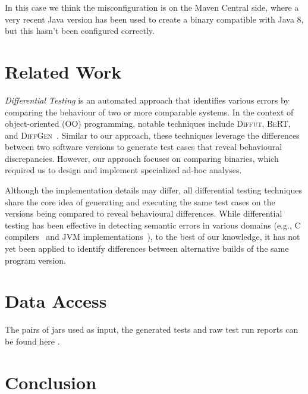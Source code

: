 \documentclass[conference]{IEEEtran}
\newcommand{\jens}[1]{\textbf{\textcolor{magenta}{[ \ding{46}Jens: #1]}}}
\renewcommand{\jens}[1]{}
\begin{document}
In this case we think the misconfiguration is on the Maven Central side, where a very recent Java version has been used to create a binary compatible with Java 8, but this hasn't been configured correctly.





\section{Related Work}
\label{sec:relatedwork}

\emph{Differential Testing}\cite{difftesting} is an automated approach that identifies various errors by comparing the behaviour of two or more comparable systems\cite{xie2007towards,jin10:automated,diffgen}. In the context of object-oriented (OO) programming, notable techniques include \textsc{Diffut}\cite{xie2007towards}, \textsc{BeRT}\cite{jin10:automated}, and \textsc{DiffGen}~\cite{diffgen}. Similar to our approach, these techniques leverage the differences between two software versions to generate test cases that reveal behavioural discrepancies. However, our approach focuses on comparing binaries, which required us to design and implement specialized ad-hoc analyses.

Although the implementation details may differ, all differential testing techniques share the core idea of generating and executing the same test cases on the versions being compared to reveal behavioural differences. %
While differential testing has been effective in detecting semantic errors in various domains (e.g., C compilers~\cite{Yang:compiler:pldi:2011} and JVM implementations~\cite{Chen:jvmdiff:pldi:2016}), to the best of our knowledge, it has not yet been applied to identify differences between alternative builds of the same program version.


\section{Data Access}
\label{sec:dataaccess}

The pairs of jars used as input, the generated tests and raw test run reports can be found here \jens{@Tim todo}. 


\section{Conclusion}
\label{sec:conclusion}
\end{document}
